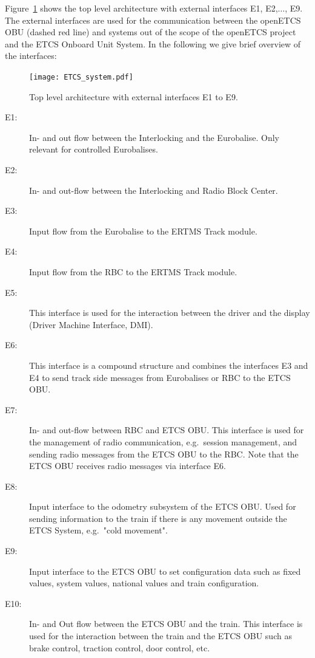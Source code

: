 Figure~\ref{f:top_level} shows the top level architecture with external interfaces E1, E2,$\ldots$, E9. The external interfaces are used for the communication between the openETCS OBU (dashed red line) and systems out of the scope of the openETCS project and the ETCS Onboard Unit System. In the following we give  brief overview of the interfaces:
\begin{figure}
\centering
\texttt{[image: ETCS\_system.pdf]}
\caption{Top level architecture with external interfaces E1 to E9.}
\label{f:top_level}
\end{figure}

\begin{description}
\item[E1:] In- and out flow between the Interlocking and the Eurobalise. Only relevant for controlled Eurobalises.

\item[E2:] In- and out-flow between the Interlocking and Radio Block Center.

\item[E3:] Input flow from the Eurobalise to the ERTMS Track module.

\item[E4:] Input flow from the RBC to the ERTMS Track module.

\item[E5:] This interface is used for the interaction between the driver and the display (Driver Machine Interface, DMI).

\item[E6:] This interface is a compound structure and combines the interfaces E3 and E4 to send track side messages from Eurobalises or RBC to the ETCS OBU.

\item[E7:] In- and out-flow between RBC and ETCS OBU. This interface is used for the management of radio communication, e.g.~session management, and sending radio messages from the ETCS OBU to the RBC. Note that the ETCS OBU receives radio messages via interface E6.

\item[E8:] Input interface to the odometry subsystem of the ETCS OBU. Used for sending information to the train if there is any movement outside the ETCS System, e.g.~"cold movement".

\item[E9:] Input interface to the ETCS OBU to set configuration data such as fixed values, system values, national values and train configuration.

\item[E10:] In- and Out flow between the ETCS OBU and the train. This interface is used for the interaction between the train and the ETCS OBU such as brake control, traction control, door control, etc.
\end{description}


